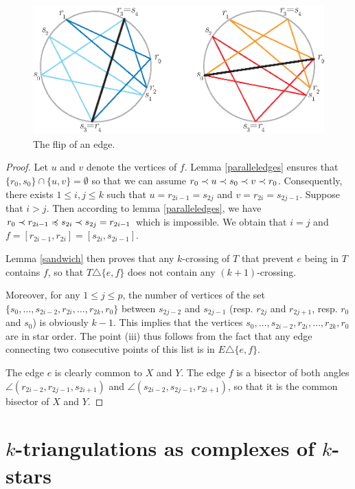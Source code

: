 \documentclass[12pt]{amsart}
\begin{document}
\begin{figure}
\centerline{\includegraphics[scale=1]{flip.eps}}
\caption{\small{The flip of an edge.}}\label{flip}
\end{figure}

\begin{proof}
Let $u$ and $v$ denote the vertices of $f$.
Lemma \ref{paralleledges} ensures that $\{r_0,s_0\}\cap\{u,v\}=\emptyset$ so that we can assume $r_0\prec u\prec s_0\prec v\prec r_0$. Consequently, there exists $1\le i,j\le k$ such that $u=r_{2i-1}=s_{2j}$ and $v=r_{2i}=s_{2j-1}$. Suppose that $i>j$. Then according to  lemma \ref{paralleledges}, we have $r_0\prec r_{2i-1}\preccurlyeq s_{2i}\prec s_{2j}=r_{2i-1}$ which is impossible. We obtain that $i=j$ and $f=[r_{2i-1},r_{2i}]=[s_{2i},s_{2i-1}]$.

Lemma \ref{sandwich} then proves that any $k$-crossing of $T$ that prevent $e$ being in $T$ contains $f$, so that $T\triangle\{e,f\}$ does not contain any $(k+1)$-crossing.

Moreover, for any $1\le j\le p$, the number of vertices of the set $\{s_0,\ldots,s_{2i-2},r_{2i},\ldots,r_{2k},r_0\}$ between $s_{2j-2}$ and $s_{2j-1}$ (resp. $r_{2j}$ and $r_{2j+1}$, resp. $r_0$ and $s_0$) is obviously $k-1$. This implies that the vertices $s_0,\ldots,s_{2i-2},r_{2i},\ldots,r_{2k},r_0$ are in star order. The point (iii) thus follows from the fact that any edge connecting two consecutive points of this list is in $E\triangle\{e,f\}$.

The edge $e$ is clearly common to $X$ and $Y$. The edge $f$ is a bisector of both angles $\angle(r_{2i-2},r_{2j-1},s_{2i+1})$ and $\angle(s_{2i-2},s_{2j-1},r_{2i+1})$, so that it is the common bisector of $X$ and $Y$.
\end{proof}





\section{$k$-triangulations as complexes of $k$-stars}\label{sectioncomplexes}
\end{document}

